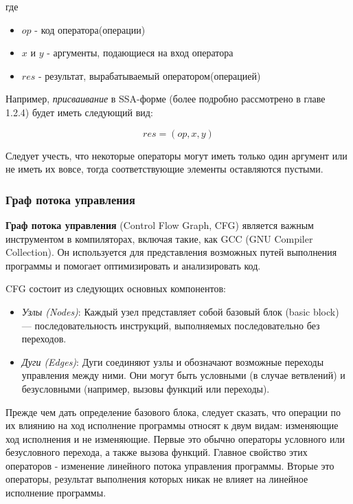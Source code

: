 где
\begin{itemize}
    \item $op$ - код оператора(операции)
    \item $x$ и $y$ - аргументы, подающиеся на вход оператора
    \item $res$ - результат, вырабатываемый оператором(операцией)
\end{itemize}

Например, \textit{присваивание} в SSA-форме (более подробно рассмотрено в главе 1.2.4) будет иметь следующий вид:

\begin{equation}
    res = (op, x, y)
    \label{formula assign}
\end{equation}

Следует учесть, что некоторые операторы могут иметь только один аргумент или не иметь их вовсе, тогда соответствующие элементы оставляются пустыми.

\subsubsection{Граф потока управления}

\textbf{Граф потока управления} (Control Flow Graph, CFG) является важным инструментом в компиляторах, включая такие, как GCC (GNU Compiler Collection). Он используется для представления возможных путей выполнения программы и помогает оптимизировать и анализировать код.

CFG состоит из следующих основных компонентов:

\begin{itemize}
    \item \textit{Узлы (Nodes)}: Каждый узел представляет собой базовый блок (basic block) — последовательность инструкций, выполняемых последовательно без переходов.
    \item \textit{Дуги (Edges)}: Дуги соединяют узлы и обозначают возможные переходы управления между ними. Они могут быть условными (в случае ветвлений) и безусловными (например, вызовы функций или переходы).
\end{itemize}

Прежде чем дать определение базового блока, следует сказать, что операции по их влиянию на ход исполнение программы относят к двум видам: изменяющие ход исполнения и не изменяющие. Первые это обычно операторы условного или безусловного перехода, а также вызова функций. Главное свойство этих операторов - изменение линейного потока управления программы. Вторые это операторы, результат выполнения которых никак не влияет на линейное исполнение программы.

